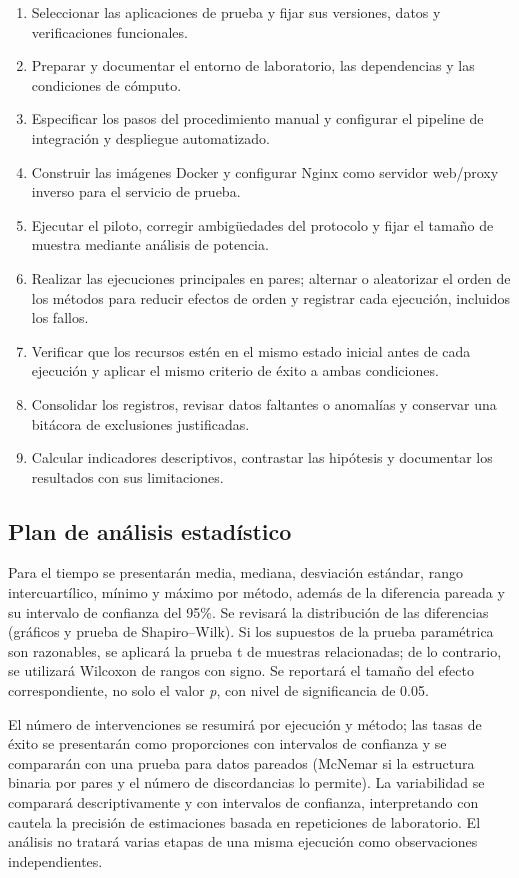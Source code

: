 \documentclass[12pt,a4paper]{article}
\begin{document}
\begin{enumerate}
  \item Seleccionar las aplicaciones de prueba y fijar sus versiones, datos y verificaciones funcionales.
  \item Preparar y documentar el entorno de laboratorio, las dependencias y las condiciones de cómputo.
  \item Especificar los pasos del procedimiento manual y configurar el pipeline de integración y despliegue automatizado.
  \item Construir las imágenes Docker y configurar Nginx como servidor web/proxy inverso para el servicio de prueba.
  \item Ejecutar el piloto, corregir ambigüedades del protocolo y fijar el tamaño de muestra mediante análisis de potencia.
  \item Realizar las ejecuciones principales en pares; alternar o aleatorizar el orden de los métodos para reducir efectos de orden y registrar cada ejecución, incluidos los fallos.
  \item Verificar que los recursos estén en el mismo estado inicial antes de cada ejecución y aplicar el mismo criterio de éxito a ambas condiciones.
  \item Consolidar los registros, revisar datos faltantes o anomalías y conservar una bitácora de exclusiones justificadas.
  \item Calcular indicadores descriptivos, contrastar las hipótesis y documentar los resultados con sus limitaciones.
\end{enumerate}

\subsection{Plan de análisis estadístico}

Para el tiempo se presentarán media, mediana, desviación estándar, rango intercuartílico, mínimo y máximo por método, además de la diferencia pareada y su intervalo de confianza del 95\%. Se revisará la distribución de las diferencias (gráficos y prueba de Shapiro--Wilk). Si los supuestos de la prueba paramétrica son razonables, se aplicará la prueba t de muestras relacionadas; de lo contrario, se utilizará Wilcoxon de rangos con signo. Se reportará el tamaño del efecto correspondiente, no solo el valor \textit{p}, con nivel de significancia de 0.05.

El número de intervenciones se resumirá por ejecución y método; las tasas de éxito se presentarán como proporciones con intervalos de confianza y se compararán con una prueba para datos pareados (McNemar si la estructura binaria por pares y el número de discordancias lo permite). La variabilidad se comparará descriptivamente y con intervalos de confianza, interpretando con cautela la precisión de estimaciones basada en repeticiones de laboratorio. El análisis no tratará varias etapas de una misma ejecución como observaciones independientes.
\end{document}
